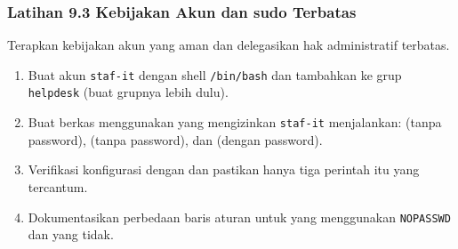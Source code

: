 \subsubsection*{Latihan 9.3 Kebijakan Akun dan sudo Terbatas}
Terapkan kebijakan akun yang aman dan delegasikan hak administratif terbatas.
\begin{enumerate}
    \item Buat akun \texttt{staf-it} dengan shell \texttt{/bin/bash} dan tambahkan ke grup \texttt{helpdesk} (buat grupnya lebih dulu).
    \item Buat berkas  menggunakan  yang mengizinkan \texttt{staf-it} menjalankan:  (tanpa password),  (tanpa password), dan  (dengan password).
    \item Verifikasi konfigurasi dengan  dan pastikan hanya tiga perintah itu yang tercantum.
    \item Dokumentasikan perbedaan baris aturan untuk yang menggunakan \texttt{NOPASSWD} dan yang tidak.
\end{enumerate}


